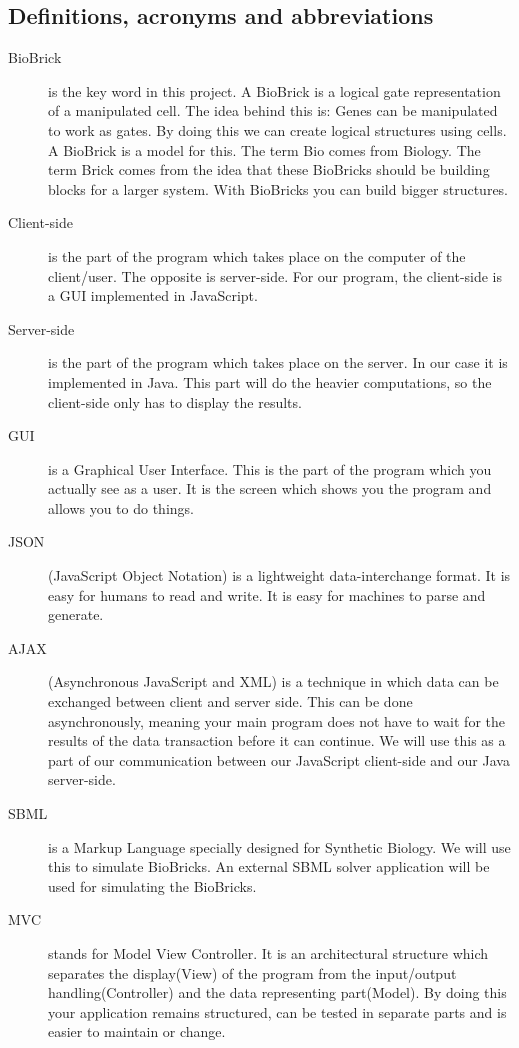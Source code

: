 \documentclass[a4paper]{article}
\begin{document}
\subsection{Definitions, acronyms and abbreviations}
\begin{description}
	\item[BioBrick] is the key word in this project. A BioBrick is a logical gate representation of a manipulated cell. The idea behind this is: Genes can be manipulated to work as gates. By doing this we can create logical structures using cells. A BioBrick is a model for this. The term Bio comes from Biology. The term Brick comes from the idea that these BioBricks should be building blocks for a larger system. With BioBricks you can build bigger structures. 
	\item[Client-side] is the part of the program which takes place on the computer of the client/user. The opposite is server-side. For our program, the client-side is a GUI implemented in JavaScript. 
	\item[Server-side] is the part of the program which takes place on the server. In our case it is implemented in Java. This part will do the heavier computations, so the client-side only has to display the results.
	\item[GUI] is a Graphical User Interface. This is the part of the program which you actually see as a user. It is the screen which shows you the program and allows you to do things. 
	\item[JSON] (JavaScript Object Notation) is a lightweight data-interchange format. It is easy for humans to read and write. It is easy for machines to parse and generate.
	\item[AJAX] (Asynchronous JavaScript and XML) is a technique in which data can be exchanged between client and server side. This can be done asynchronously, meaning your main program does not have to wait for the results of the data transaction before it can continue. We will use this as a part of our communication between our JavaScript client-side and our Java server-side.
	\item[SBML] is a Markup Language specially designed for Synthetic Biology. We will use this to simulate BioBricks. An external SBML solver application will be used for simulating the BioBricks.\\

	\item[MVC] stands for Model View Controller. It is an architectural structure which separates the display(View) of the program from the input/output handling(Controller) and the data representing part(Model). By doing this your application remains structured, can be tested in separate parts and is easier to maintain or change.
\end{description}
\end{document}
